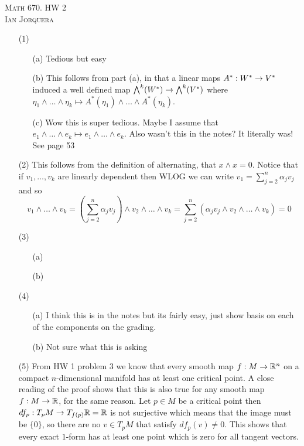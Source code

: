 \documentclass[12pt]{amsart}
\begin{document}
\begin{center}
    \textsc{Math 670. HW 2\\ Ian Jorquera}
\end{center}
\vspace{1em}
\begin{itemize} %
    \item[(1)]
    \begin{itemize}
        \item[(a)] Tedious but easy 
        \item[(b)] %
        This follows from part (a), in that a linear maps $A^*:W^*\rightarrow V^*$ induced a well defined map $\bigwedge^k(W^*)\rightarrow \bigwedge^k(V^*)$ where $\eta_1\wedge\dots\wedge \eta_k\mapsto A^*(\eta_1)\wedge\dots\wedge A^*(\eta_k)$.
        \item[(c)] Wow this is super tedious. Maybe I assume that $e_1\wedge\dots\wedge e_k\mapsto e_1\wedge\dots\wedge e_k$. Also wasn't this in the notes? It literally was! See page 53
    \end{itemize}
    \item[(2)] %
    This follows from the definition of alternating, that $x\wedge x=0$. Notice that if $v_1,\dots,v_k$ are linearly dependent then WLOG we can write $v_1=\sum_{j=2}^n \alpha_j v_j$ and so 
    \[v_1\wedge\dots\wedge v_k= \left(\sum_{j=2}^n \alpha_j v_j\right)\wedge v_2\wedge\dots\wedge v_k=\sum_{j=2}^n\left( \alpha_j v_j\wedge v_2\wedge\dots\wedge v_k\right)=0\]
    \item[(3)]
    \begin{itemize}
        \item[(a)]
        \item[(b)]
    \end{itemize}
    \item[(4)]
    \begin{itemize}
        \item[(a)] I think this is in the notes but its fairly easy, just show basis on each of the components on the grading.
        \item[(b)] Not sure what this is asking 
    \end{itemize}
    \item[(5)] %
    From HW 1 problem 3 we know that every smooth map $f:M\rightarrow \mathbb{R}^n$ on a compact $n$-dimensional manifold has at least one critical point. A close reading of the proof shows that this is also true for any smooth map $f:M\rightarrow \mathbb{R}$, for the same reason.
    Let $p\in M$ be a critical point then $df_p: T_pM\rightarrow T_{f(p)}\mathbb{R}=\mathbb{R}$ is not surjective which means that the image must be $\{0\}$, so there are no $v\in T_pM$ that satisfy $df_p(v)\neq 0$.
    This shows that every exact $1$-form has at least one point which is zero for all tangent vectors.
\end{itemize}
\end{document}

